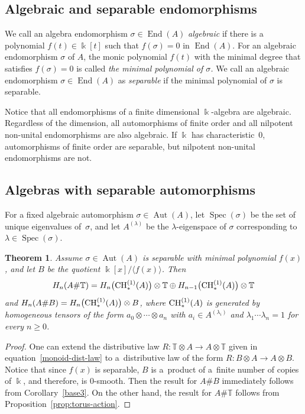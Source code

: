 \documentclass[10pt,a4paper]{amsart}
\newcommand{\B}[1]{\mathbb{#1}}
\newcommand{\CH}{{\rm CH}}
\renewcommand{\geq}{\geqslant}
\numberwithin{equation}{section}
\newtheorem{Theorem}{Theorem}[section]
\begin{document}
\subsection{Algebraic and separable endomorphisms}

We call an algebra endomorphism $\sigma\in \operatorname{End}(A)$ \emph{algebraic} if there is a
polynomial $f(t)\in\Bbbk[t]$ such that $f(\sigma) = 0$ in $\operatorname{End}(A)$. For an algebraic
endomorphism $\sigma$ of $A$, the monic polynomial $f(t)$ with the minimal degree that
satisfies $f(\sigma)=0$ is called \emph{the minimal polynomial of $\sigma$.} We call an
algebraic endomorphism $\sigma\in \operatorname{End}(A)$ as \emph{separable} if the minimal polynomial of
$\sigma$ is separable.

Notice that all endomorphisms of a finite dimensional $\Bbbk$-algebra are algebraic.
Regardless of the dimension, all automorphisms of finite order and all nilpotent non-unital
endomorphisms are also algebraic. If $\Bbbk$ has characteristic~0, automorphisms of finite
order are separable, but nilpotent non-unital endomorphisms are not.

\subsection{Algebras with separable automorphisms}\label{sect:separable}

For a fixed algebraic automorphism $\sigma\in \operatorname{Aut}(A)$, let $\operatorname{Spec}(\sigma)$ be the set of
unique eigenvalues of~$\sigma$, and let $A^{(\lambda)}$ be the $\lambda$-eigenspace of
$\sigma$ corresponding to $\lambda \in \operatorname{Spec}(\sigma)$.

\begin{Theorem}\label{thm:separable}
 Assume $\sigma\in \operatorname{Aut}(A)$ is separable with minimal polynomial $f(x)$, and let
 $B$ be the quotient $\Bbbk[x]/\langle f(x)\rangle$. Then
 \[ H_n(A\# \B{T})
 = H_n\bigl(\CH_*^{(1)}(A)\bigr)\otimes\B{T} \oplus H_{n-1}\bigl(\CH_*^{(1)}(A)\bigr)\otimes \B{T}
 \] and
$ H_n(A\# B) = H_n\bigl(\CH_*^{(1)}(A)\bigr)\otimes B$, where $\CH_*^{(1)}(A)$ is generated by homogeneous tensors of the form
$a_0\otimes\cdots\otimes a_n$ with $ a_i\in A^{(\lambda_i)}
$ and $\lambda_1\cdots\lambda_n=1
$ for every $n\geq 0$.
\end{Theorem}

\begin{proof}
 One can extend the distributive law $R\colon \B{T}\otimes A\to A\otimes\B{T}$ given in
 equation~\eqref{monoid-dist-law} to a~distributive law of the form
 $R\colon B\otimes A\to A\otimes B$. Notice that since $f(x)$ is separable, $B$ is a~product of a~finite number of copies of $\Bbbk$, and therefore, is $0$-smooth. Then the result for $A\# B$
 immediately follows from Corollary~\ref{base3}. On the other hand, the result for $A\# \B{T}$
 follows from Proposition~\ref{prop:torus-action}.
\end{proof}
\end{document}
